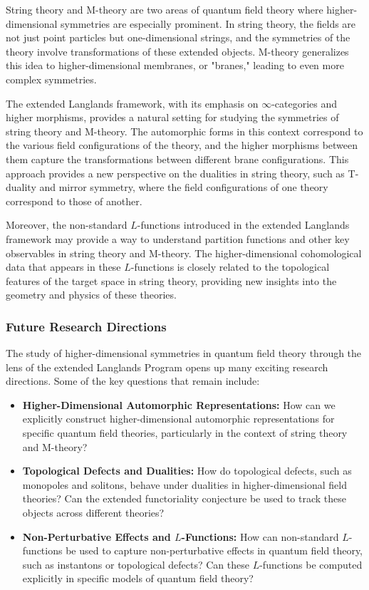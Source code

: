 \documentclass{article}
\theoremstyle{remark}
\begin{document}
String theory and M-theory are two areas of quantum field theory where higher-dimensional symmetries are especially prominent. In string theory, the fields are not just point particles but one-dimensional strings, and the symmetries of the theory involve transformations of these extended objects. M-theory generalizes this idea to higher-dimensional membranes, or "branes," leading to even more complex symmetries.

The extended Langlands framework, with its emphasis on $\infty$-categories and higher morphisms, provides a natural setting for studying the symmetries of string theory and M-theory. The automorphic forms in this context correspond to the various field configurations of the theory, and the higher morphisms between them capture the transformations between different brane configurations. This approach provides a new perspective on the dualities in string theory, such as T-duality and mirror symmetry, where the field configurations of one theory correspond to those of another.

Moreover, the non-standard $L$-functions introduced in the extended Langlands framework may provide a way to understand partition functions and other key observables in string theory and M-theory. The higher-dimensional cohomological data that appears in these $L$-functions is closely related to the topological features of the target space in string theory, providing new insights into the geometry and physics of these theories.

\subsubsection{Future Research Directions}

The study of higher-dimensional symmetries in quantum field theory through the lens of the extended Langlands Program opens up many exciting research directions. Some of the key questions that remain include:
\begin{itemize}
    \item \textbf{Higher-Dimensional Automorphic Representations:} How can we explicitly construct higher-dimensional automorphic representations for specific quantum field theories, particularly in the context of string theory and M-theory?
    \item \textbf{Topological Defects and Dualities:} How do topological defects, such as monopoles and solitons, behave under dualities in higher-dimensional field theories? Can the extended functoriality conjecture be used to track these objects across different theories?
    \item \textbf{Non-Perturbative Effects and $L$-Functions:} How can non-standard $L$-functions be used to capture non-perturbative effects in quantum field theory, such as instantons or topological defects? Can these $L$-functions be computed explicitly in specific models of quantum field theory?
\end{itemize}
\end{document}
